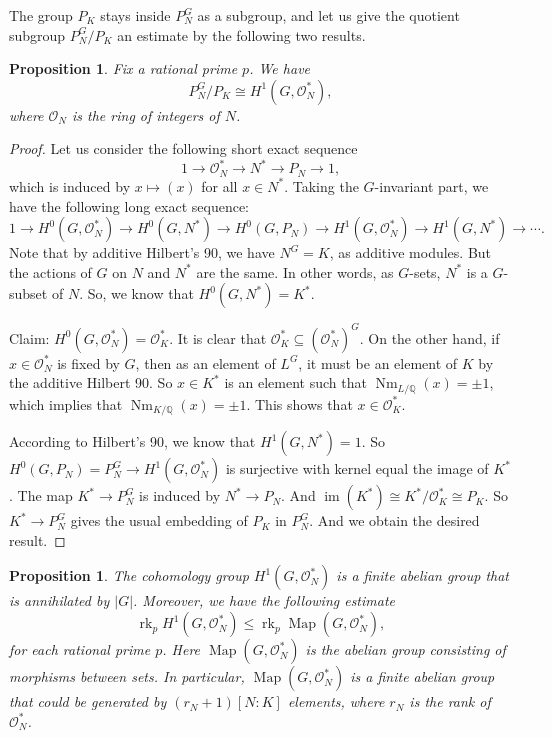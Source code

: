\documentclass{amsart}
\numberwithin{equation}{section}
\theoremstyle{plain}
\newtheorem{proposition}[theorem]{Proposition}
\theoremstyle{definition}
\theoremstyle{remark}
\begin{document}
The group $P_K$ stays inside $P_N^G$ as a subgroup, and let us give the quotient subgroup $P_N^G/P_K$ an estimate by the following two results.
\begin{proposition}\label{prop: P(L)^G/P(K)}
    Fix a rational prime $p$.
    We have
	\begin{equation*}
		P_N^G/P_K\cong H^1(G,\mathscr{O}_N^*),
	\end{equation*}
	where $\mathscr{O}_N$ is the ring of integers of $N$.
\end{proposition}
\begin{proof}
	Let us consider the following short exact sequence
	\begin{equation*}
		1\to\mathscr{O}_N^*\to N^*\to P_N\to1,
	\end{equation*}
	which is induced by $x\mapsto (x)$ for all $x\in N^*$.
	Taking the $G$-invariant part, we have the following long exact sequence:
	\begin{equation*}
		1\to H^0(G,\mathscr{O}_N^*)\to H^0(G,N^*)\to H^0(G,P_N)\to H^1(G,\mathscr{O}_N^*)\to H^1(G,N^*)\to\cdots.
	\end{equation*}
	Note that by additive Hilbert's 90, we have $N^G=K$, as additive modules.
	But the actions of \(G\) on $N$ and $N^*$ are the same.
	In other words, as $G$-sets, $N^*$ is a $G$-subset of $N$.
	So, we know that $H^0(G,N^*)=K^*$.
	
	Claim: $H^0(G,\mathscr{O}_N^*)=\mathscr{O}_K^*$.
	It is clear that $\mathscr{O}_K^*\subseteq(\mathscr{O}_N^*)^G$.
	On the other hand, if $x\in\mathscr{O}_N^*$ is fixed by $G$, then as an element of $L^G$, it must be an element of $K$ by the additive Hilbert 90.
	So $x\in K^*$ is an element such that $\operatorname{Nm}_{L/\mathbb{Q}}(x)=\pm1$, which implies that $\operatorname{Nm}_{K/\mathbb{Q}}(x)=\pm1$.
	This shows that $x\in\mathscr{O}_K^*$.
	
	According to Hilbert's 90, we know that $H^1(G,N^*)=1$.
	So $H^0(G,P_N)=P_N^G\to H^1(G,\mathscr{O}_N^*)$ is surjective with kernel equal the image of $K^*$.
	The map $K^*\to P_N^G$ is induced by $N^*\to P_N$. 
	And $\operatorname{im}(K^*)\cong K^*/\mathscr{O}_K^*\cong P_K$.
	So $K^*\to P_N^G$ gives the usual embedding of $P_K$ in $P_N^G$.
	And we obtain the desired result.
\end{proof}
\begin{proposition}\label{prop: H^1(G,O_L^*)}
	The cohomology group $H^1(G,\mathscr{O}_N^*)$ is a finite abelian group that is annihilated by $\lvert G\rvert$.
	Moreover, we have the following estimate
	\begin{equation*}
		\operatorname{rk}_{p}H^1(G,\mathscr{O}_N^*)\leq\operatorname{rk}_{p}\operatorname{Map}(G,\mathscr{O}_N^*),
	\end{equation*}
	for each rational prime $p$.
	Here $\operatorname{Map}(G,\mathscr{O}_N^*)$ is the abelian group consisting of morphisms between sets.
	In particular, $\operatorname{Map}(G,\mathscr{O}_N^*)$ is a finite abelian group that could be generated by $(r_N+1)[N:K]$ elements, where $r_N$ is the rank of $\mathscr{O}_N^*$.
\end{proposition}
\end{document}

